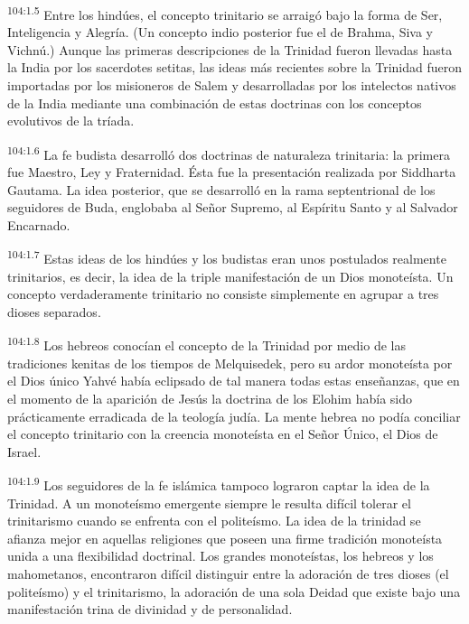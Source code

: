 \documentclass[twoside, 11pt]{book}
\begin{document}
\par
\textsuperscript{104:1.5} Entre los hindúes, el concepto trinitario se arraigó bajo la forma de Ser, Inteligencia y Alegría. (Un concepto indio posterior fue el de Brahma, Siva y Vichnú.) Aunque las primeras descripciones de la Trinidad fueron llevadas hasta la India por los sacerdotes setitas, las ideas más recientes sobre la Trinidad fueron importadas por los misioneros de Salem y desarrolladas por los intelectos nativos de la India mediante una combinación de estas doctrinas con los conceptos evolutivos de la tríada.

\par
\textsuperscript{104:1.6} La fe budista desarrolló dos doctrinas de naturaleza trinitaria: la primera fue Maestro, Ley y Fraternidad. Ésta fue la presentación realizada por Siddharta Gautama. La idea posterior, que se desarrolló en la rama septentrional de los seguidores de Buda, englobaba al Señor Supremo, al Espíritu Santo y al Salvador Encarnado.

\par
\textsuperscript{104:1.7} Estas ideas de los hindúes y los budistas eran unos postulados realmente trinitarios, es decir, la idea de la triple manifestación de un Dios monoteísta. Un concepto verdaderamente trinitario no consiste simplemente en agrupar a tres dioses separados.

\par
\textsuperscript{104:1.8} Los hebreos conocían el concepto de la Trinidad por medio de las tradiciones kenitas de los tiempos de Melquisedek, pero su ardor monoteísta por el Dios único Yahvé había eclipsado de tal manera todas estas enseñanzas, que en el momento de la aparición de Jesús la doctrina de los Elohim había sido prácticamente erradicada de la teología judía. La mente hebrea no podía conciliar el concepto trinitario con la creencia monoteísta en el Señor Único, el Dios de Israel.

\par
\textsuperscript{104:1.9} Los seguidores de la fe islámica tampoco lograron captar la idea de la Trinidad. A un monoteísmo emergente siempre le resulta difícil tolerar el trinitarismo cuando se enfrenta con el politeísmo. La idea de la trinidad se afianza mejor en aquellas religiones que poseen una firme tradición monoteísta unida a una flexibilidad doctrinal. Los grandes monoteístas, los hebreos y los mahometanos, encontraron difícil distinguir entre la adoración de tres dioses (el politeísmo) y el trinitarismo, la adoración de una sola Deidad que existe bajo una manifestación trina de divinidad y de personalidad.
\end{document}
